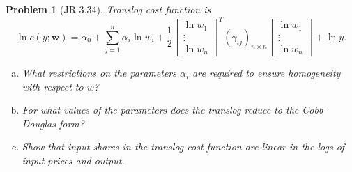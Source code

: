 \documentclass{article}
\newtheorem*{prob}{{\bf Problem}}
\newcommand{\1}{{\bf 1}}
\newcommand{\0}{{\mathbf{0}}}
\newcommand{\w}{{\mathbf{w}}}
\newcommand{\<}{\langle}
\renewcommand{\>}{\rangle}
\begin{document}
\begin{prob}[JR 3.34] Translog cost function is 
	 \begin{equation}
	\ln c ( y; \w) = \alpha_0 + \sum_{j =1 }^n \alpha_ i \ln w_i + \frac12 \begin{bmatrix}
\ln w_1  \\ \vdots \\ \ln w_n
	\end{bmatrix}^T (\gamma_{ij})_{n \times n } \begin{bmatrix}
	\ln w_1  \\ \vdots \\ \ln w_n
	\end{bmatrix} + \ln y.
	\end{equation}
	
	\begin{enumerate}[(a)]
		\item  What restrictions on the parameters $\alpha_i$ are required to ensure homogeneity with respect to $w$?
		\item For what values of the parameters does the translog reduce to the Cobb-Douglas form?
		\item Show that input shares in the translog cost function are linear in the logs of input prices and
		output.
	\end{enumerate}
\end{prob}
\end{document}
